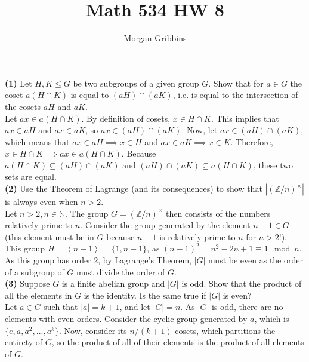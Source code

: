 \documentclass[12pt,letterpaper]{article}
\title{Math 534 HW 8}
\author{Morgan Gribbins}
\date{}
\begin{document}
	
\maketitle

\textbf{(1)} Let \(H, K \leq G\) be two subgroups of a given group \(G\). Show that for \(a \in G\) the coset \(a(H \cap K)\) is equal to \((aH)\cap (aK)\), i.e. is equal to the intersection of the cosets \(aH\) and \(aK\). \\

Let \(ax \in a(H \cap K)\). By definition of cosets, \(x \in H \cap K\). This implies that \(ax \in aH\) and \(ax \in aK\), so \(ax \in (aH) \cap (aK)\). Now, let \(ax \in (aH) \cap (aK)\), which means that \(ax \in aH \implies x \in H\) and \(ax \in aK \implies x \in K\). Therefore, \(x \in H \cap K \implies ax \in a(H \cap K)\). Because \(a(H \cap K) \subseteq (aH) \cap (aK) \text{ and } (aH) \cap (aK) \subseteq a(H \cap K)\), these two sets are equal. \\

\textbf{(2)} Use the Theorem of Lagrange (and its consequences) to show that \(|(\mathbb{Z}/n)^{\times}|\) is always even when \(n > 2\). \\

Let \(n > 2, n \in \mathbb{N}\). The group \(G = (\mathbb{Z}/n)^{\times}\) then consists of the numbers relatively prime to \(n\). Consider the group generated by the element \(n-1 \in G\) (this element must be in \(G\) because \(n-1\) is relatively prime to \(n\) for \(n > 2\)!). This group \(H = \left<n-1\right> = \{1, n-1\}\), as \((n-1)^{2} = n^{2} - 2n + 1 \equiv 1 \mod n\). As this group has order \(2\), by Lagrange's Theorem, \(|G|\) must be even as the order of a subgroup of \(G\) must divide the order of \(G\). \\

\textbf{(3)} Suppose \(G\) is a finite abelian group and \(|G|\) is odd. Show that the product of all the elements in \(G\) is the identity. Is the same true if \(|G|\) is even? \\

Let \(a \in G\) such that \(|a| = k+1\), and let \(|G| = n\). As \(|G|\) is odd, there are no elements with even orders. Consider the cyclic group generated by \(a\), which is \(\{e, a, a^{2}, ..., a^{k}\}\). Now, consider its \(n/(k+1)\) cosets, which partitions the entirety of \(G\), so the product of all of their elements is the product of all elements of \(G\).\\
\end{document}
